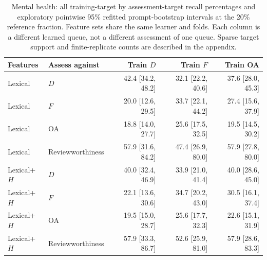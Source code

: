 \begin{table}[htbp]
\centering\small
\caption{Mental health: all training-target by assessment-target recall percentages and exploratory pointwise 95\% refitted prompt-bootstrap intervals at the 20\% reference fraction. Feature sets share the same learner and folds. Each column is a different learned queue, not a different assessment of one queue. Sparse target support and finite-replicate counts are described in the appendix.}
\label{tab:transfermentalhealth}
\begin{tabular}{llrrr}
\toprule
Features & Assess against & Train $D$ & Train $F$ & Train OA \\
\midrule
Lexical & $D$ & 42.4 [34.2, 48.2] & 32.1 [22.2, 40.6] & 37.6 [28.0, 45.3] \\
Lexical & $F$ & 20.0 [12.6, 29.5] & 33.7 [22.1, 44.2] & 27.4 [15.6, 37.9] \\
Lexical & OA & 18.8 [14.0, 27.7] & 25.6 [17.5, 32.5] & 19.5 [14.5, 30.2] \\
Lexical & Reviewworthiness & 57.9 [31.6, 84.2] & 47.4 [26.9, 80.0] & 57.9 [27.8, 80.0] \\
Lexical+$H$ & $D$ & 40.0 [32.4, 46.9] & 33.9 [21.0, 41.4] & 40.0 [28.6, 45.0] \\
Lexical+$H$ & $F$ & 22.1 [13.6, 30.6] & 34.7 [20.2, 43.0] & 30.5 [16.1, 37.4] \\
Lexical+$H$ & OA & 19.5 [15.0, 28.7] & 25.6 [17.7, 32.3] & 22.6 [15.1, 31.9] \\
Lexical+$H$ & Reviewworthiness & 57.9 [33.3, 86.7] & 52.6 [25.9, 81.0] & 57.9 [28.6, 83.3] \\
\bottomrule
\end{tabular}
\end{table}
